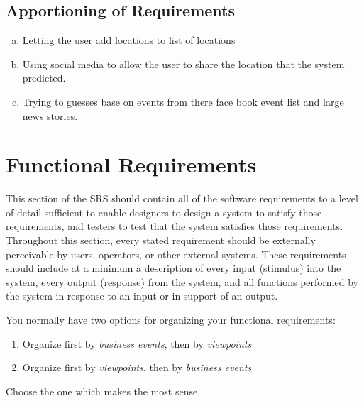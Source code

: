 \documentclass[titlepage]{article}
\begin{document}
\subsection{Apportioning of Requirements}
\label{sub:apportioning_of_requirements}
\begin{enumerate}[a)]
	\item Letting the user add locations to list of locations
	\item Using social media to allow the user to share the location that the system predicted.
	\item Trying to guesses base on events from there face book event list and large news stories.
	
\end{enumerate}

\section{Functional Requirements}
\label{sec:functional_requirements}
This section of the SRS should contain all of the software requirements to a level of detail sufficient to enable designers to design a system to satisfy those requirements, and testers to test that the system satisfies those requirements. Throughout this section, every stated requirement should be externally perceivable by users, operators, or other external systems. These requirements should include at a minimum a description of every input (stimulus) into the system, every output (response) from the system, and all functions performed by the system in response to an input or in support of an output.

You normally have two options for organizing your functional requirements:
\begin{enumerate}
	\item Organize first by \emph{business events}, then by \emph{viewpoints}
	\item Organize first by \emph{viewpoints}, then by \emph{business events}
\end{enumerate}
Choose the one which makes the most sense.
\end{document}
